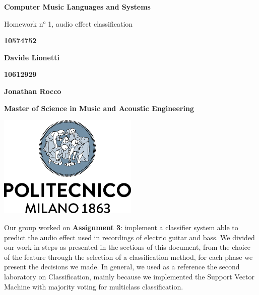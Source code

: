 \documentclass[a4paper,12pt]{report}
\begin{document}
\begin{titlepage}
\begin{center}
    \vspace*{1cm}
    
    \Huge
    \textbf{Computer Music Languages and Systems}
    
    \vspace{0.5cm}
    \LARGE
    Homework n° 1, audio effect classification

    \vspace{1 cm}
    
    \textbf{10574752}
    
    \vspace{0.5cm}
    
    \textbf{Davide Lionetti}
     
    \vspace{0.5cm}
    
    \textbf{10612929}
     
    
    \vspace{0.5cm}
    
    \textbf{Jonathan Rocco}
    
    \vspace{0.5cm}
    
    \vfill
    
   
    \date{April 2021}
    \vspace{0.3cm}
    \textbf{Master of Science in Music and Acoustic Engineering}
    
    \vspace{0.8cm}
    
    \includegraphics[width=0.5\textwidth]{logo_positivo.png}
    
\end{center}
\end{titlepage}


\abstract{}
Our group worked on \textbf{Assignment 3}: implement a 			  	classifier system able to predict the audio effect used in 			 	recordings of electric guitar and bass. We divided our work in 		 	steps as presented in the sections of this document, from the  	      	choice of the feature through the selection of a classification 		method, for each phase we present the decisions we made. In 			general, we used as a reference the second laboratory on 				Classification, mainly because we implemented the Support Vector 	Machine with majority voting for multiclass classification.
\endabstract{}
\end{document}
